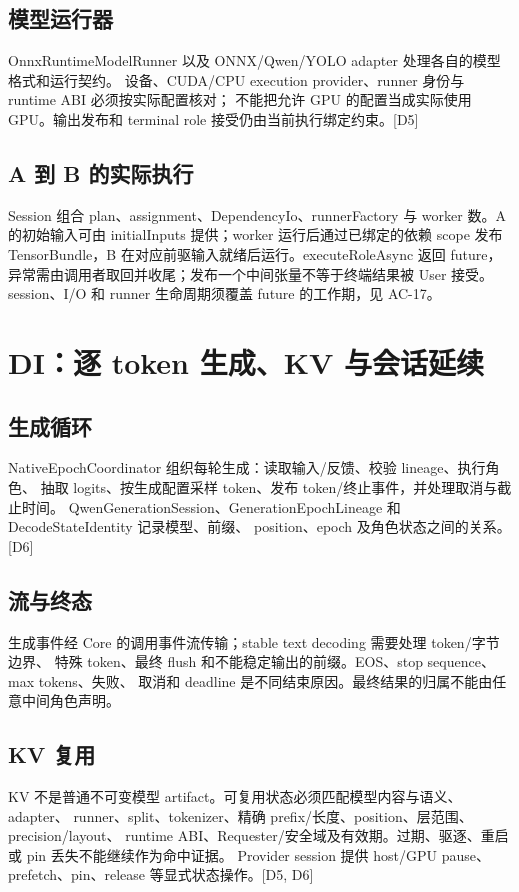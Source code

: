 \subsection{模型运行器}
OnnxRuntimeModelRunner 以及 ONNX/Qwen/YOLO adapter 处理各自的模型格式和运行契约。
设备、CUDA/CPU execution provider、runner 身份与 runtime ABI 必须按实际配置核对；
不能把允许 GPU 的配置当成实际使用 GPU。输出发布和 terminal role 接受仍由当前执行绑定约束。[D5]


\subsection{A 到 B 的实际执行}
Session 组合 plan、assignment、DependencyIo、runnerFactory 与 worker 数。A 的初始输入可由 initialInputs 提供；worker 运行后通过已绑定的依赖 scope 发布 TensorBundle，B 在对应前驱输入就绪后运行。executeRoleAsync 返回 future，异常需由调用者取回并收尾；发布一个中间张量不等于终端结果被 User 接受。session、I/O 和 runner 生命周期须覆盖 future 的工作期，见 AC-17。

\newpage

\section{DI：逐 token 生成、KV 与会话延续}
\subsection{生成循环}
NativeEpochCoordinator 组织每轮生成：读取输入/反馈、校验 lineage、执行角色、
抽取 logits、按生成配置采样 token、发布 token/终止事件，并处理取消与截止时间。
QwenGenerationSession、GenerationEpochLineage 和 DecodeStateIdentity 记录模型、前缀、
position、epoch 及角色状态之间的关系。[D6]

\subsection{流与终态}
生成事件经 Core 的调用事件流传输；stable text decoding 需要处理 token/字节边界、
特殊 token、最终 flush 和不能稳定输出的前缀。EOS、stop sequence、max tokens、失败、
取消和 deadline 是不同结束原因。最终结果的归属不能由任意中间角色声明。

\subsection{KV 复用}
KV 不是普通不可变模型 artifact。可复用状态必须匹配模型内容与语义、adapter、
runner、split、tokenizer、精确 prefix/长度、position、层范围、precision/layout、
runtime ABI、Requester/安全域及有效期。过期、驱逐、重启或 pin 丢失不能继续作为命中证据。
Provider session 提供 host/GPU pause、prefetch、pin、release 等显式状态操作。[D5, D6]

